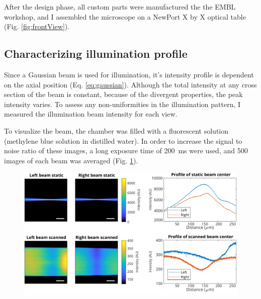   After the design phase, all custom parts were manufactured the the EMBL workshop, and I assembled the microscope on a NewPort X by X optical table (Fig. \ref{fig:frontView}).

  \subsection{Characterizing illumination profile}
    Since a Gaussian beam is used for illumination, it's intensity profile is dependent on the axial position (Eq. \ref{eq:gaussian}). Although the total intensity at any cross section of the beam is constant, because of the divergent properties, the peak intensity varies. To assess any non-uniformities in the illumination pattern, I measured the illumination beam intensity for each view.

    To visualize the beam, the chamber was filled with a fluorescent solution (methylene blue solution in distilled water). In order to increase the signal to noise ratio of these images, a long exposure time of \SI{200}{ms} were used, and 500 images of each beam was averaged (Fig. \ref{fig:beamProfiles}).

    \begin{figure}[htb]
      \centering
      \includegraphics[width=\textwidth]{beamProfile488.pdf}
      \label{fig:beamProfiles}
    \end{figure}


